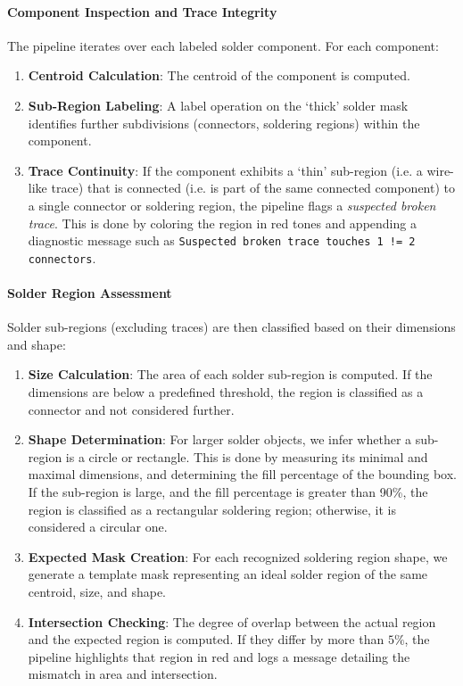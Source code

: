 \documentclass[a4paper,12pt]{article}
\begin{document}
\paragraph{Component Inspection and Trace Integrity}

The pipeline iterates over each labeled solder component. For each component:
\begin{enumerate}
    \item \textbf{Centroid Calculation}: The centroid of the component is computed.
    \item \textbf{Sub-Region Labeling}: A label operation on the `thick' solder mask identifies further subdivisions (connectors, soldering regions) within the component.
    \item \textbf{Trace Continuity}: If the component exhibits a `thin' sub-region (i.e. a wire-like trace) that is connected (i.e. is part of the same connected component) to a single connector or soldering region, the pipeline flags a \textit{suspected broken trace}. This is done by coloring the region in red tones and appending a diagnostic message such as \texttt{Suspected broken trace touches 1 != 2 connectors}.
\end{enumerate}

\paragraph{Solder Region Assessment}

Solder sub-regions (excluding traces) are then classified based on their dimensions and shape:
\begin{enumerate}
    \item \textbf{Size Calculation}: The area of each solder sub-region is computed. If the dimensions are below a predefined threshold, the region is classified as a connector and not considered further.
    \item \textbf{Shape Determination}: For larger solder objects, we infer whether a sub-region is a circle or rectangle. This is done by measuring its minimal and maximal dimensions, and determining the fill percentage of the bounding box. If the sub-region is large, and the fill percentage is greater than 90\%, the region is classified as a rectangular soldering region; otherwise, it is considered a circular one.
    \item \textbf{Expected Mask Creation}: For each recognized soldering region shape, we generate a template mask representing an ideal solder region of the same centroid, size, and shape.
    \item \textbf{Intersection Checking}: The degree of overlap between the actual region and the expected region is computed. If they differ by more than \(5\%\), the pipeline highlights that region in red and logs a message detailing the mismatch in area and intersection.
\end{enumerate}
\end{document}
